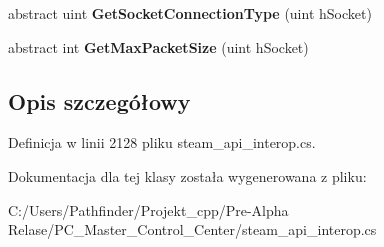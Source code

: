 \begin{DoxyCompactItemize}
\item 
\mbox{\label{class_valve_1_1_steamworks_1_1_i_steam_networking_a2cbc391ec97ebae45b154fa601402fcc}} 
abstract uint {\bfseries Get\+Socket\+Connection\+Type} (uint h\+Socket)
\item 
\mbox{\label{class_valve_1_1_steamworks_1_1_i_steam_networking_aaac1d1d16b568da50ecc71de2c2e5afb}} 
abstract int {\bfseries Get\+Max\+Packet\+Size} (uint h\+Socket)
\end{DoxyCompactItemize}


\subsection{Opis szczegółowy}


Definicja w linii 2128 pliku steam\+\_\+api\+\_\+interop.\+cs.



Dokumentacja dla tej klasy została wygenerowana z pliku\+:\begin{DoxyCompactItemize}
\item 
C\+:/\+Users/\+Pathfinder/\+Projekt\+\_\+cpp/\+Pre-\/\+Alpha Relase/\+P\+C\+\_\+\+Master\+\_\+\+Control\+\_\+\+Center/steam\+\_\+api\+\_\+interop.\+cs\end{DoxyCompactItemize}
